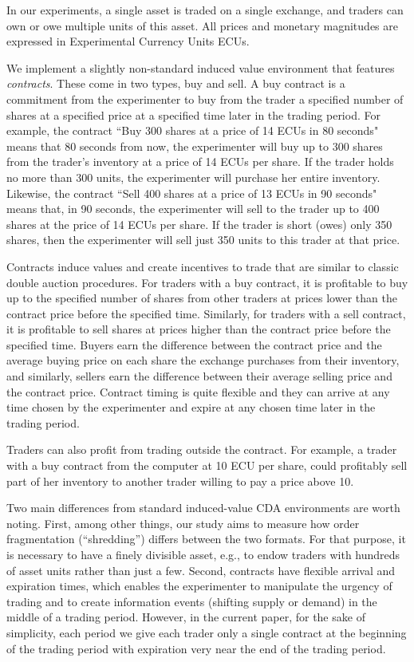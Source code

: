 In our experiments, a single asset is traded on a single exchange, and traders can own or owe multiple units of this asset. All prices and monetary magnitudes are expressed in Experimental Currency Units ECUs.

We implement a slightly non-standard induced value environment that features  \textit{contracts}. These come in two types, buy and sell.
A buy contract is a commitment from the experimenter to buy from the trader a specified number of shares at a specified price at a specified time later in the trading period. 
For example, the contract ``Buy 300 shares at a price of 14 ECUs in 80 seconds" means that 80 seconds from now, the experimenter will buy up to 300 shares from the trader's inventory at a price of 14 ECUs per share. If the trader holds no more than 300 units, the experimenter will purchase her entire inventory. 
Likewise, the contract ``Sell 400 shares at a price of 13 ECUs in 90 seconds" means that, in 90 seconds, the experimenter will sell to the trader up to 400 shares at the price of 14 ECUs per share. If the trader is short (owes) only 350 shares, then the experimenter will sell just 350 units to this trader at that price. 

Contracts induce values and create incentives to trade that are similar to classic double auction procedures.
For traders with a buy contract, it is profitable to buy up to the specified number of shares from other traders at prices lower than the contract price before the specified time. 
Similarly, for traders with a sell contract, it is profitable to sell shares at prices higher than the contract price before the specified time. 
Buyers earn the difference between the contract price and the average buying price on each share the exchange purchases from their  inventory, and similarly, sellers  earn the difference between their average selling price and the contract price. 
Contract timing is quite flexible and they can arrive at any time chosen by the experimenter and expire at any chosen time later in the trading period. 

Traders can also profit from trading outside the contract. For example, a trader with a buy contract from the computer at 10 ECU per share, could profitably sell part of her inventory to another trader willing to pay a price above 10. 

Two main differences from standard induced-value CDA environments are worth noting. First, among other things, our study aims to measure how order fragmentation (``shredding'') differs between the two formats. For that purpose, it is necessary to have a finely divisible asset, e.g., to endow traders with hundreds of asset units rather than just a few.  
Second, contracts  have flexible arrival and expiration times, which enables the experimenter to manipulate the urgency of trading and to create information events (shifting supply or demand) in the middle of a trading period. However, in the current paper, for the sake of simplicity, each period we give each trader only a single contract at the beginning of the trading period with expiration very near the end of the trading period. 

